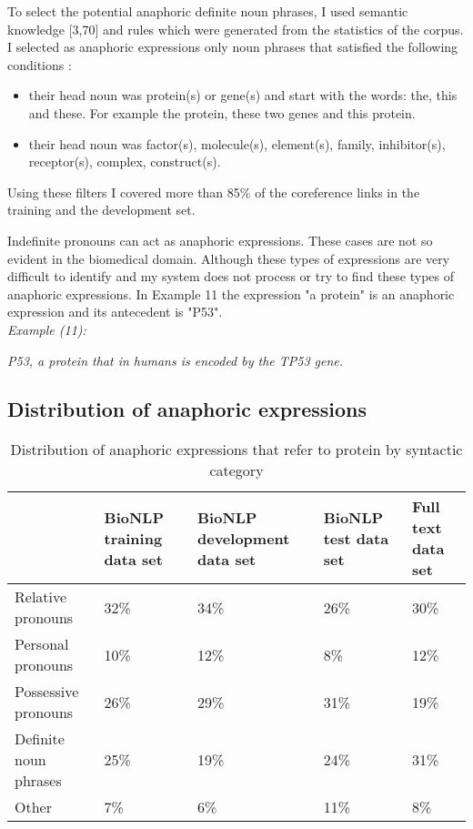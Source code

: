 To select the potential anaphoric definite noun phrases, I used semantic knowledge [3,70] and  rules which were generated from the statistics of the corpus. I selected as anaphoric expressions only noun phrases that satisfied the following conditions :

\begin{itemize}
	\item their head noun was protein(s) or gene(s) and start with the words: the, this and these. For example the protein, these two genes and this protein.
	\item their head noun was factor(s), molecule(s), element(s), family, inhibitor(s), receptor(s), complex, construct(s). 
\end{itemize}

Using these filters I covered more than 85\% of the coreference links in the training and the development set.

Indefinite pronouns can act as anaphoric expressions. These cases are not so evident in the biomedical domain. Although these types of expressions are very difficult to identify and my system does not process or try to find these types of anaphoric expressions. In Example 11 the expression "a protein" is an anaphoric expression and its antecedent is "P53". \\
\newpage
\emph{Example (11):}
\begin{changemargin}{10mm}{10mm} 
  \emph{P53, a protein that in humans is encoded by the TP53 gene.}  
\end{changemargin} 
\vspace{4mm}

\subsection{Distribution of anaphoric expressions}
\begin{table}[h]
\centering
   \begin{center}
	 \begin{tabular}{l | C{2cm} C{2cm} C{2cm} C{2cm}}
 		
  		& {\footnotesize BioNLP training data set} & {\footnotesize BioNLP development data set} & {\footnotesize BioNLP test data set} & {\footnotesize Full text data set}\\
 		\hline
 		Relative pronouns & 32\% & 34\% & 26\% & 30\% \\[1.1ex]
 		\hline 
 		Personal pronouns & 10\% & 12\% & 8\% &12\% \\ [1.1ex]
 		\hline   
 		Possessive pronouns & 26\% & 29\% & 31\% &19\% \\ [1.1ex]
 		\hline  
 		Definite noun phrases & 25\% & 19\% & 24\% & 31\% \\[1.1ex]
 		\hline  
 		Other & 7\% & 6\% & 11\% &8\% \\ [1.1 ex]
 		\hline   
	\end{tabular}
  \end{center} 
  \caption{ Distribution of anaphoric expressions that refer to protein by  syntactic category}
\end{table}
  
